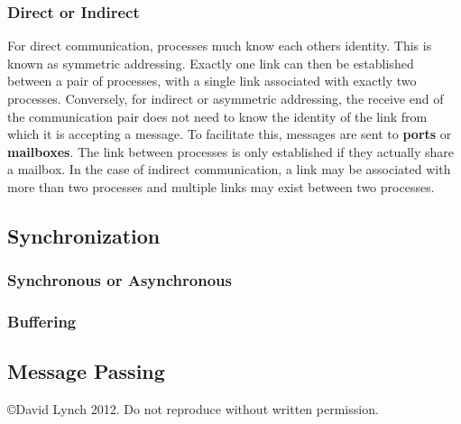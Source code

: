 \documentclass[10pt,a4paper]{article}
\begin{document}
\subsubsection{Direct or Indirect}
For direct communication, processes much know each others identity. This is known as symmetric addressing.  Exactly one link can then be established between a pair of processes, with a single link associated with exactly two processes. Conversely, for indirect or asymmetric addressing, the receive end of the communication pair does not need to know the identity of the link from which it is accepting a message. To facilitate this, messages are sent to {\bf ports} or {\bf mailboxes}. The link between processes is only established if they actually share a mailbox. In the case of indirect communication, a link may be associated with more than two processes and multiple links may exist between two processes.
\subsection{Synchronization} 
\subsubsection{Synchronous or Asynchronous}
\subsubsection{Buffering}


\subsection{Message Passing}

{}

\begin{center}
{\small \copyright  David Lynch 2012. Do not reproduce without written permission.}
\end{center}
\end{document}
